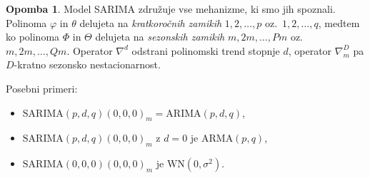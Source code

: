 \documentclass[11pt]{amsart}
\newcommand{\WN}{\mathrm{WN}}
\theoremstyle{definition}
\newtheorem{opomba}[definicija]{Opomba}
\theoremstyle{plain}
\begin{document}
\begin{opomba}
    Model SARIMA združuje vse mehanizme, ki smo jih spoznali. Polinoma $\varphi$ in $\theta$ 
    delujeta na \emph{kratkoročnih zamikih} $1, 2, \ldots, p$ oz.\ $1, 2, \ldots, q$, 
    medtem ko polinoma $\Phi$ in $\Theta$ delujeta na \emph{sezonskih zamikih} 
    $m, 2m, \ldots, Pm$ oz.\ $m, 2m, \ldots, Qm$. Operator $\nabla^d$ odstrani polinomski 
    trend stopnje $d$, operator $\nabla_m^D$ pa $D$-kratno sezonsko nestacionarnost.
    
    Posebni primeri:
    \begin{itemize}
        \item $\mathrm{SARIMA}(p,d,q)(0,0,0)_m = \mathrm{ARIMA}(p,d,q)$,
        \item $\mathrm{SARIMA}(p,d,q)(0,0,0)_m$ z $d = 0$ je $\mathrm{ARMA}(p,q)$,
        \item $\mathrm{SARIMA}(0,0,0)(0,0,0)_m$ je $\WN(0,\sigma^2)$.
    \end{itemize}
\end{opomba}
\end{document}
